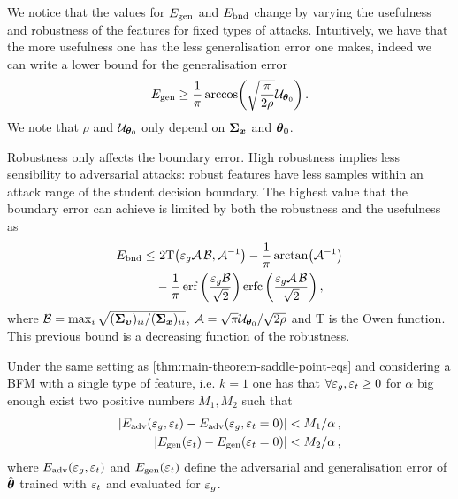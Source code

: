 \documentclass[a0paper,fleqn]{betterportraitposter}
\theoremstyle{plain}
\theoremstyle{definition}
\theoremstyle{remark}
\begin{document}
{\begin{multicols}{3}
We notice that the values for \(E_{\mathrm{gen}}\) and \(E_{\mathrm{bnd}}\) change by varying the usefulness and robustness of the features for fixed types of attacks. 
Intuitively, we have that the more usefulness one has the less generalisation error one makes, indeed we can write a lower bound for the generalisation error
\begin{equation}\label{eq:bound-gen-error}
    E_{\mathrm{gen}}
    \geq
    \frac{1}{\pi} \arccos( \sqrt{\frac{\pi}{2 \rho}} \mathcal{U}_{\boldsymbol{\theta}_0} ) \,. 
\end{equation}
We note that \(\rho\) and \(\mathcal{U}_{\boldsymbol{\theta}_0}\) only depend on \(\boldsymbol{\Sigma}_{\boldsymbol{\boldsymbol{x}}}\) and \(\boldsymbol{\theta}_0\).

Robustness only affects the boundary error. 
High robustness implies less sensibility to adversarial attacks: robust features have less samples within an attack range of the student decision boundary. 
The highest value that the boundary error can achieve is limited by both the robustness and the usefulness as
\begin{align} \label{eq:bound-boundary-error}
    \bounderr \leq & \  
    2 \mathrm{T}\qty( \advgencost \mathcal{A} \, \mathcal{B}, \mathcal{A}^{-1} ) - \frac{1}{\pi} \arctan( \mathcal{A}^{-1} ) \nonumber\\ 
    & - \frac{1}{\pi} \erf\qty( \frac{\advgencost \mathcal{B}}{\sqrt{2}} ) \erfc\qty( \frac{\advgencost \mathcal{A} \, \mathcal{B}}{\sqrt{2}} ) \,,
\end{align}
where \(\mathcal{B} = \max_i \sqrt{(\boldsymbol{\Sigma}_{\boldsymbol{\upsilon}})_{ii} / (\boldsymbol{\Sigma}_{\boldsymbol{\boldsymbol{x}}})_{ii}}\), \(\mathcal{A} = \sqrt{\pi} \mathcal{U}_{\boldsymbol{\theta}_0} / \sqrt{2 \rho}\) and \(\mathrm{T}\) is the Owen function. This previous bound is a decreasing function of the robustness.


Under the same setting as \cref{thm:main-theorem-saddle-point-eqs} and considering a BFM with a single type of feature, i.e. \(k=1\) one has that \(\forall \varepsilon_g, \varepsilon_t \geq 0\) for \(\alpha\) big enough 
exist two positive numbers $M_1, M_2$ such that
\begin{equation}
\begin{aligned}
    \abs{
        E_{\mathrm{adv}}(\varepsilon_g, \varepsilon_t) - E_{\mathrm{adv}}(\varepsilon_g,  \varepsilon_t = 0)
    } & < M_1 / \alpha \,, \\
    \abs{
        E_{\mathrm{gen}}(\varepsilon_t) - E_{\mathrm{gen}}(\varepsilon_t = 0)
    } & < M_2 / \alpha \,,
\end{aligned}
\end{equation}
where \(E_{\mathrm{adv}}(\varepsilon_g, \varepsilon_t)\) and \(E_{\mathrm{gen}}(\varepsilon_t)\) define the adversarial and generalisation error of \(\hat{\boldsymbol{\theta}}\) trained with \(\varepsilon_t\) and evaluated for \(\varepsilon_g\).


\end{multicols}}
\end{document}

